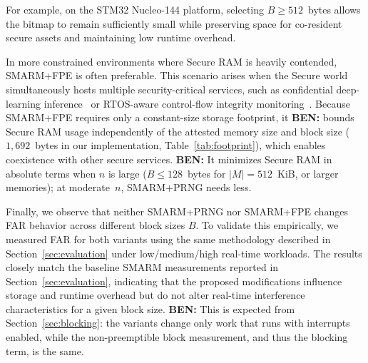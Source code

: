 \documentclass{ieeeaccess}
\DeclareRobustCommand{\ben}[1]{{\color{BENcolor}\textbf{BEN:} #1}}
\newcommand{\rtsmarmone}{SMARM+PRNG\xspace}
\newcommand{\rtsmarmtwo}{SMARM+FPE\xspace}
\begin{document}
For example, on the STM32 Nucleo-144 platform, selecting $B \geq 512$~bytes allows the bitmap to remain sufficiently small while preserving space for co-resident secure assets and maintaining low runtime overhead.

In more constrained environments where Secure RAM is heavily contended, \rtsmarmtwo is often preferable.
This scenario arises when the Secure world simultaneously hosts multiple security-critical services, such as confidential deep-learning inference~\cite{tslices} or RTOS-aware control-flow integrity monitoring~\cite{tzmcfi}.
Because \rtsmarmtwo requires only a constant-size storage footprint, it \ben{bounds Secure RAM usage independently of the attested memory size and block size ($1{,}692$~bytes in our implementation, Table~\ref{tab:footprint}), which} enables coexistence with other secure services.
\ben{It minimizes Secure RAM in absolute terms when $n$ is large ($B \le 128$~bytes for $|M| = 512$~KiB, or larger memories); at moderate~$n$, \rtsmarmone needs less.}

Finally, we observe that neither \rtsmarmone nor \rtsmarmtwo changes FAR behavior across different block sizes $B$.
To validate this empirically, we measured FAR for both variants using the same methodology described in Section~\ref{sec:evaluation} under low/medium/high real-time workloads.
The results closely match the baseline SMARM measurements reported in Section~\ref{sec:evaluation}, indicating that the proposed modifications influence storage and runtime overhead but do not alter real-time interference characteristics for a given block size.
\ben{This is expected from Section~\ref{sec:blocking}: the variants change only work that runs with interrupts enabled, while the non-preemptible block measurement, and thus the blocking term, is the same.}
\end{document}
